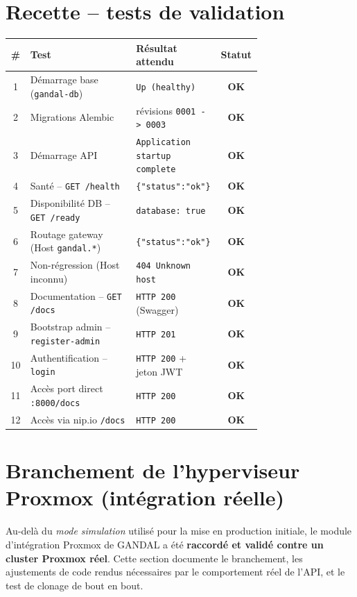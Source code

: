 \documentclass[11pt,a4paper]{article}
\newcommand{\code}[1]{\texttt{\small #1}}
\newcommand{\ok}{\textcolor{ok}{\textbf{OK}}}
\begin{document}
\section{Recette -- tests de validation}

\begin{longtable}{@{}c >{\raggedright\arraybackslash}p{0.42\linewidth} >{\raggedright\arraybackslash}p{0.30\linewidth} c@{}}
\toprule
\textbf{\#} & \textbf{Test} & \textbf{Résultat attendu} & \textbf{Statut} \\
\midrule
\endhead
1 & Démarrage base (\code{gandal-db}) & \code{Up (healthy)} & \ok \\
2 & Migrations Alembic & révisions \code{0001 -> 0003} & \ok \\
3 & Démarrage API & \code{Application startup complete} & \ok \\
4 & Santé -- \code{GET /health} & \code{\{"status":"ok"\}} & \ok \\
5 & Disponibilité DB -- \code{GET /ready} & \code{database: true} & \ok \\
6 & Routage gateway (Host \code{gandal.*}) & \code{\{"status":"ok"\}} & \ok \\
7 & Non-régression (Host inconnu) & \code{404 Unknown host} & \ok \\
8 & Documentation -- \code{GET /docs} & \code{HTTP 200} (Swagger) & \ok \\
9 & Bootstrap admin -- \code{register-admin} & \code{HTTP 201} & \ok \\
10 & Authentification -- \code{login} & \code{HTTP 200} + jeton JWT & \ok \\
11 & Accès port direct \code{:8000/docs} & \code{HTTP 200} & \ok \\
12 & Accès via nip.io \code{/docs} & \code{HTTP 200} & \ok \\
\bottomrule
\end{longtable}

\newpage{}
\section{Branchement de l'hyperviseur Proxmox (intégration réelle)}

Au-delà du \emph{mode simulation} utilisé pour la mise en production initiale, le module
d'intégration Proxmox de GANDAL a été \textbf{raccordé et validé contre un cluster
Proxmox réel}. Cette section documente le branchement, les ajustements de code rendus
nécessaires par le comportement réel de l'API, et le test de clonage de bout en bout.
\end{document}
